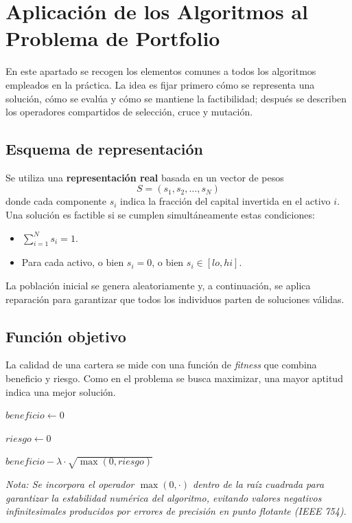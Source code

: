 \section{Aplicación de los Algoritmos al Problema de Portfolio}
\label{sec:aplicacion}

En este apartado se recogen los elementos comunes a todos los algoritmos empleados en la práctica. La idea es fijar primero cómo se representa una solución, cómo se evalúa y cómo se mantiene la factibilidad; después se describen los operadores compartidos de selección, cruce y mutación.

\subsection{Esquema de representación}
Se utiliza una \textbf{representación real} basada en un vector de pesos
$$
S = (s_1, s_2, \dots, s_N)
$$
donde cada componente $s_i$ indica la fracción del capital invertida en el activo $i$. Una solución es factible si se cumplen simultáneamente estas condiciones:
\begin{itemize}
    \item $\sum_{i=1}^N s_i = 1$.
    \item Para cada activo, o bien $s_i = 0$, o bien $s_i \in [lo, hi]$.
\end{itemize}

La población inicial se genera aleatoriamente y, a continuación, se aplica reparación para garantizar que todos los individuos parten de soluciones válidas.

\subsection{Función objetivo}
La calidad de una cartera se mide con una función de \textit{fitness} que combina beneficio y riesgo. Como en el problema se busca maximizar, una mayor aptitud indica una mejor solución.

\begin{algorithm}[H]
\SetAlgoLined
{}

$beneficio \leftarrow 0$


$riesgo \leftarrow 0$


\Return $beneficio - \lambda \cdot \sqrt{\max(0, riesgo)}$
\caption{Evaluación de una solución}
\end{algorithm}
\textit{Nota: Se incorpora el operador $\max(0, \cdot)$ dentro de la raíz cuadrada para garantizar la estabilidad numérica del algoritmo, evitando valores negativos infinitesimales producidos por errores de precisión en punto flotante (IEEE 754).}

